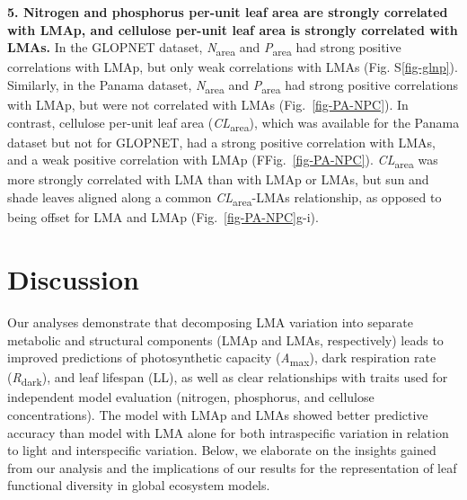 \documentclass[
  12pt,
  a4paper,
,tablecaptionabove
]{scrartcl}
\begin{document}
\textbf{5. Nitrogen and phosphorus per-unit leaf area are strongly
correlated with LMAp, and cellulose per-unit leaf area is strongly
correlated with LMAs.} In the GLOPNET dataset,
\emph{N}\textsubscript{area} and \emph{P}\textsubscript{area} had strong
positive correlations with LMAp, but only weak correlations with LMAs
(Fig. S\ref{fig-glnp}). Similarly, in the Panama dataset,
\emph{N}\textsubscript{area} and \emph{P}\textsubscript{area} had strong
positive correlations with LMAp, but were not correlated with LMAs
(Fig.~\ref{fig-PA-NPC}). In contrast, cellulose per-unit leaf area
(\emph{CL}\textsubscript{area}), which was available for the Panama
dataset but not for GLOPNET, had a strong positive correlation with
LMAs, and a weak positive correlation with LMAp
(FFig.~\ref{fig-PA-NPC}). \emph{CL}\textsubscript{area} was more
strongly correlated with LMA than with LMAp or LMAs, but sun and shade
leaves aligned along a common \emph{CL}\textsubscript{area}-LMAs
relationship, as opposed to being offset for LMA and LMAp
(Fig.~\ref{fig-PA-NPC}g-i).

\hypertarget{discussion}{%
\section{Discussion}\label{discussion}}

Our analyses demonstrate that decomposing LMA variation into separate
metabolic and structural components (LMAp and LMAs, respectively) leads
to improved predictions of photosynthetic capacity
(\emph{A}\textsubscript{max}), dark respiration rate
(\emph{R}\textsubscript{dark}), and leaf lifespan (LL), as well as clear
relationships with traits used for independent model evaluation
(nitrogen, phosphorus, and cellulose concentrations). The model with
LMAp and LMAs showed better predictive accuracy than model with LMA
alone for both intraspecific variation in relation to light and
interspecific variation. Below, we elaborate on the insights gained from
our analysis and the implications of our results for the representation
of leaf functional diversity in global ecosystem models.
\end{document}
